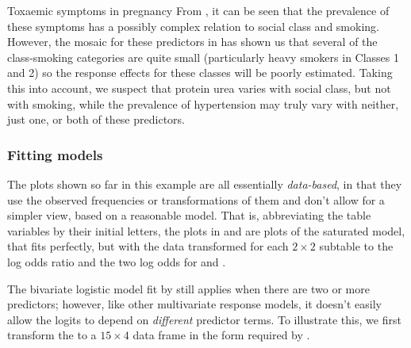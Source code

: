 \documentclass[11pt]{book}\usepackage[]{graphicx}\usepackage[]{color}
\newenvironment{knitrout}{}{} %
\renewenvironment{knitrout}{\small\renewcommand{\baselinestretch}{.85}}{} %
\begin{document}
\begin{Example}[toxaemia]{Toxaemic symptoms in pregnancy}
\begin{knitrout}
\end{knitrout}
From , it can be seen that the prevalence of these
symptoms has a possibly complex relation to social class and smoking.
However, the mosaic for these predictors in  has shown
us that several of the class-smoking categories are quite small
(particularly heavy smokers in Classes 1 and 2)
so the response effects for these classes will be poorly estimated.
Taking this into account,
we suspect that protein urea varies with social class, but not with
smoking, while the prevalence of hypertension may truly vary with neither,
just one, or both of these predictors.

\subsubsection*{Fitting models}

The plots shown so far in this example are all essentially \emph{data-based}, in that
they use the observed frequencies or transformations of them and don't
allow for a simpler view, based on a reasonable model.  That is,
abbreviating the table variables by their initial letters,
the plots in
 and  are plots of the
saturated model,  that fits perfectly, but with the data transformed
for each $2 \times 2$ subtable to the log odds ratio and the two log odds
for  and .

The bivariate logistic model fit by  still applies when there are
two or more predictors; however, like other multivariate response models, it
doesn't easily allow the logits to depend on \emph{different} predictor terms.
To illustrate this, we first transform the  to a
$15 \times 4$ data frame in the form required by .


\end{Example}
\end{document}
